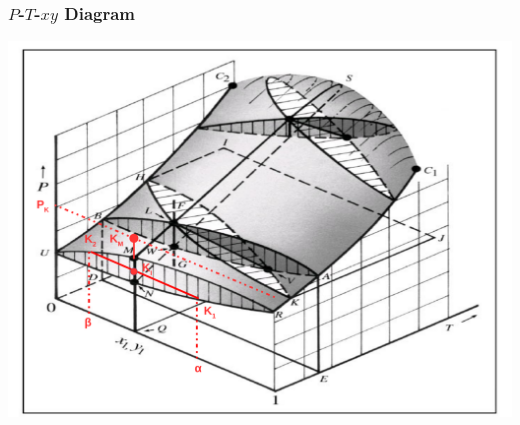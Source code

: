 \documentclass[10pt,compress,handout,ignorenonframetext,unknownkeysallowed]{beamer}
\begin{document}
\begin{frame}
  \frametitle{$P$-$T$-$xy$ Diagram}
     \begin{center}
       \includegraphics[width=.75\columnwidth,clip]{./../Pics/PTxy_Digram} %
     \end{center}
\end{frame}
\normalsize
\end{document}
